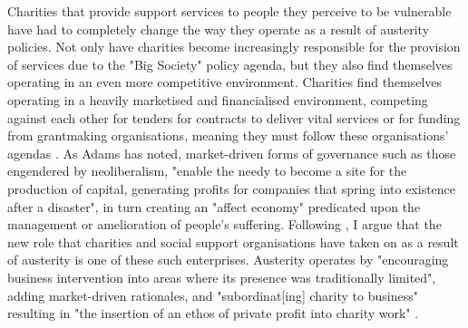 Charities that provide support services to people they perceive to be vulnerable have had to completely change the way they operate as a result of austerity policies. Not only have charities become increasingly responsible for the provision of services due to the "Big Society" policy agenda, but they also find themselves operating in an even more competitive environment. Charities find themselves operating in a heavily marketised and financialised environment, competing against each other for tenders for contracts to deliver vital services \citep{buckingham_capturing_2012} or for funding from grantmaking organisations, meaning they must follow these organisations' agendas \citep{clayton_distancing_2016}. As Adams \citeyearpar[p. 9]{adams_markets_2013} has noted, market-driven forms of governance such as those engendered by neoliberalism, "enable the needy to become a site for the production of capital, generating profits for companies that spring into existence after a disaster", in turn creating an "affect economy" predicated upon the management or amelioration of people's suffering. Following \citet{lord_profit_2018}, I argue that the new role that charities and social support organisations have taken on as a result of austerity is one of these such enterprises. Austerity operates by "encouraging business intervention into areas where its presence was traditionally limited", adding market-driven rationales, and "subordinat[ing] charity to business" resulting in "the insertion of an ethos of private profit into charity work" \citep[p. 5]{lord_profit_2018}.

